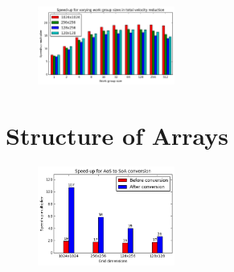 \documentclass[12pt, a4paper]{article}
\begin{document}
  \begin{multicols}{2}

    \begin{figure}[H]
      \caption{} \vspace{-0.8cm}
      \label{wgs}
      \begin{center}
        \includegraphics[width=0.4\textwidth]{figures/workgroupsize}
      \end{center}
    \end{figure}


  \end{multicols}

  \section*{Structure of Arrays}

  \begin{multicols}{2}

    \begin{figure}[H]
      \caption{} \vspace{-0.8cm}
      \label{aos2soa}
      \begin{center}
        \includegraphics[width=0.4\textwidth]{figures/aos2soa}
      \end{center}
    \end{figure}

  \end{multicols}
\end{document}
